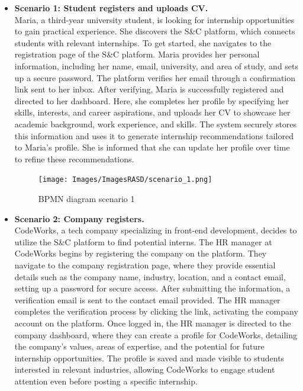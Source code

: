 \begin{itemize}
    \item \textbf{Scenario 1: Student registers and uploads CV.}  \\
    Maria, a third-year university student, is looking for internship opportunities to gain practical experience. She discovers the S\&C platform, which connects students with relevant internships. To get started, she navigates to the registration page of the S\&C platform. Maria provides her personal information, including her name, email, university, and area of study, and sets up a secure password. The platform verifies her email through a confirmation link sent to her inbox. After verifying, Maria is successfully registered and directed to her dashboard. Here, she completes her profile by specifying her skills, interests, and career aspirations, and uploads her CV to showcase her academic background, work experience, and skills. The system securely stores this information and uses it to generate internship recommendations tailored to Maria’s profile. She is informed that she can update her profile over time to refine these recommendations.

    \begin{figure}[!ht]
    \centering
    \texttt{[image: Images/ImagesRASD/scenario\_1.png]}
    \caption{BPMN diagram scenario 1}
    \end{figure}

    \item \textbf{Scenario 2: Company registers.} \\
    CodeWorks, a tech company specializing in front-end development, decides to utilize the S\&C platform to find potential interns. The HR manager at CodeWorks begins by registering the company on the platform. They navigate to the company registration page, where they provide essential details such as the company name, industry, location, and a contact email, setting up a password for secure access. After submitting the information, a verification email is sent to the contact email provided. The HR manager completes the verification process by clicking the link, activating the company account on the platform. Once logged in, the HR manager is directed to the company dashboard, where they can create a profile for CodeWorks, detailing the company's values, areas of expertise, and the potential for future internship opportunities. The profile is saved and made visible to students interested in relevant industries, allowing CodeWorks to engage student attention even before posting a specific internship.


\end{itemize}
